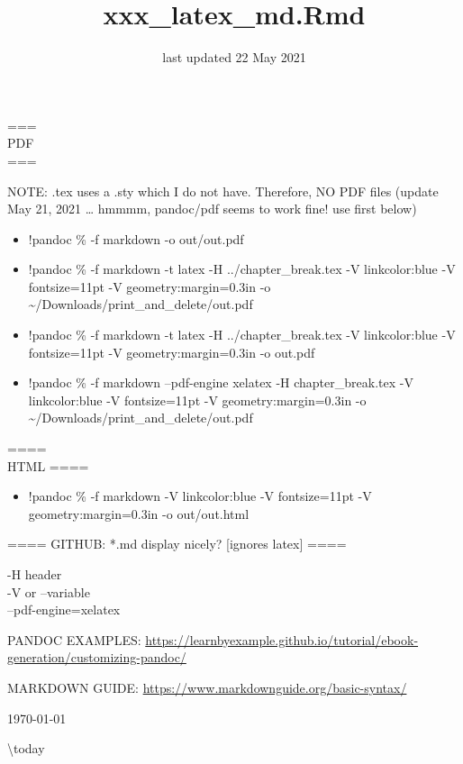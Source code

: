 \documentclass[
  10pt,
]{article}
\title{xxx\_latex\_md.Rmd}
\author{}
\date{\vspace{-2.5em}last updated 22 May 2021}
\providecommand{\tightlist}{%
  \setlength{\itemsep}{0pt}\setlength{\parskip}{0pt}}
\begin{document}
\maketitle

{
\setcounter{tocdepth}{2}
\tableofcontents
}
===\\
PDF\\
===

NOTE: .tex uses a .sty which I do not have. Therefore, NO PDF files
(update May 21, 2021 \ldots{} hmmmm, pandoc/pdf seems to work fine! use
first below)

\begin{itemize}
\tightlist
\item
  !pandoc \% -f markdown -o out/out.pdf\\
\item
  !pandoc \% -f markdown -t latex -H ../chapter\_break.tex -V
  linkcolor:blue -V fontsize=11pt -V geometry:margin=0.3in -o
  \textasciitilde/Downloads/print\_and\_delete/out.pdf
\item
  !pandoc \% -f markdown -t latex -H ../chapter\_break.tex -V
  linkcolor:blue -V fontsize=11pt -V geometry:margin=0.3in -o out.pdf
\item
  !pandoc \% -f markdown --pdf-engine xelatex -H chapter\_break.tex -V
  linkcolor:blue -V fontsize=11pt -V geometry:margin=0.3in -o
  \textasciitilde/Downloads/print\_and\_delete/out.pdf
\end{itemize}

====\\
HTML ====

\begin{itemize}
\tightlist
\item
  !pandoc \% -f markdown -V linkcolor:blue -V fontsize=11pt -V
  geometry:margin=0.3in -o out/out.html
\end{itemize}

==== GITHUB: *.md display nicely? {[}ignores latex{]} ====

-H header\\
-V or --variable\\
--pdf-engine=xelatex

PANDOC EXAMPLES:
\url{https://learnbyexample.github.io/tutorial/ebook-generation/customizing-pandoc/}

MARKDOWN GUIDE: \url{https://www.markdownguide.org/basic-syntax/}

\newpage

\today

\textbackslash today
\end{document}
